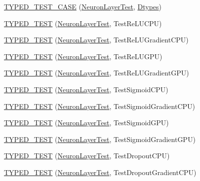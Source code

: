 \begin{DoxyCompactItemize}
\item 
\hyperlink{namespacecaffe_aa68fc3cdbfdc2044b77e42daa439f45c}{T\+Y\+P\+E\+D\+\_\+\+T\+E\+S\+T\+\_\+\+C\+A\+S\+E} (\hyperlink{classcaffe_1_1_neuron_layer_test}{Neuron\+Layer\+Test}, \hyperlink{namespacecaffe_a131dc2be50f2f10e18450da61cde6b57}{Dtypes})
\item 
\hyperlink{namespacecaffe_ac3d90a4cb28476dc847d0adc639d7a03}{T\+Y\+P\+E\+D\+\_\+\+T\+E\+S\+T} (\hyperlink{classcaffe_1_1_neuron_layer_test}{Neuron\+Layer\+Test}, Test\+Re\+L\+U\+C\+P\+U)
\item 
\hyperlink{namespacecaffe_a9f4d36af4091b53a8911d9fc00675bdd}{T\+Y\+P\+E\+D\+\_\+\+T\+E\+S\+T} (\hyperlink{classcaffe_1_1_neuron_layer_test}{Neuron\+Layer\+Test}, Test\+Re\+L\+U\+Gradient\+C\+P\+U)
\item 
\hyperlink{namespacecaffe_add935a80f9a578ae8a5ab278bd8feb15}{T\+Y\+P\+E\+D\+\_\+\+T\+E\+S\+T} (\hyperlink{classcaffe_1_1_neuron_layer_test}{Neuron\+Layer\+Test}, Test\+Re\+L\+U\+G\+P\+U)
\item 
\hyperlink{namespacecaffe_a608902b0bec09353121e3500b24d00ca}{T\+Y\+P\+E\+D\+\_\+\+T\+E\+S\+T} (\hyperlink{classcaffe_1_1_neuron_layer_test}{Neuron\+Layer\+Test}, Test\+Re\+L\+U\+Gradient\+G\+P\+U)
\item 
\hyperlink{namespacecaffe_a75f9126cbe97f2b6dc7894b9528f4814}{T\+Y\+P\+E\+D\+\_\+\+T\+E\+S\+T} (\hyperlink{classcaffe_1_1_neuron_layer_test}{Neuron\+Layer\+Test}, Test\+Sigmoid\+C\+P\+U)
\item 
\hyperlink{namespacecaffe_aa4638759079db7dacde19fa3ad3aa5a7}{T\+Y\+P\+E\+D\+\_\+\+T\+E\+S\+T} (\hyperlink{classcaffe_1_1_neuron_layer_test}{Neuron\+Layer\+Test}, Test\+Sigmoid\+Gradient\+C\+P\+U)
\item 
\hyperlink{namespacecaffe_a4fdce4daf27057c46e5ac41c33eacc49}{T\+Y\+P\+E\+D\+\_\+\+T\+E\+S\+T} (\hyperlink{classcaffe_1_1_neuron_layer_test}{Neuron\+Layer\+Test}, Test\+Sigmoid\+G\+P\+U)
\item 
\hyperlink{namespacecaffe_aef6f2f286e24685fbf90418e373e4fff}{T\+Y\+P\+E\+D\+\_\+\+T\+E\+S\+T} (\hyperlink{classcaffe_1_1_neuron_layer_test}{Neuron\+Layer\+Test}, Test\+Sigmoid\+Gradient\+G\+P\+U)
\item 
\hyperlink{namespacecaffe_ad538d60d5afb9718019179fa9f59dcfc}{T\+Y\+P\+E\+D\+\_\+\+T\+E\+S\+T} (\hyperlink{classcaffe_1_1_neuron_layer_test}{Neuron\+Layer\+Test}, Test\+Dropout\+C\+P\+U)
\item 
\hyperlink{namespacecaffe_acef73c655db65641c1da694375c6691f}{T\+Y\+P\+E\+D\+\_\+\+T\+E\+S\+T} (\hyperlink{classcaffe_1_1_neuron_layer_test}{Neuron\+Layer\+Test}, Test\+Dropout\+Gradient\+C\+P\+U)

\end{DoxyCompactItemize}
